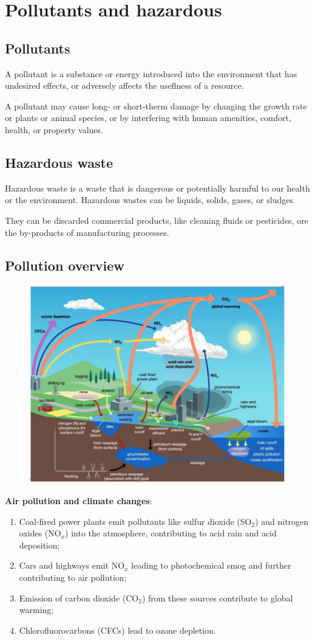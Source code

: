 \documentclass{article}
\newcommand{\cfig}[1]{%
  \begin{figure}[ht!]%
    \centering%
    #1%
  \end{figure}%
}
\begin{document}
\section{Pollutants and hazardous}
\subsection{Pollutants}
A pollutant is a substance or energy introduced into the environment that
has undesired effects, or adversely affects the useflness of a resource.

A pollutant may cause long- or short-therm damage by changing the growth
rate or plants or animal species, or by interfering with human amenities,
comfort, health, or property values.

\subsection{Hazardous waste}
Hazardous waste is a waste that is dangerous or potentially harmful to our
health or the environment. Hazardous wastes can be liquids, solids, gases, or sludges.

They can be discarded commercial products, like cleaning fluids or pesticides,
ore the by-products of manufacturing processes.

\subsection{Pollution overview}
\cfig{\includegraphics*[width=.8\textwidth]{media/pollution-overview.png}}

\textbf{Air pollution and climate changes}:
\begin{enumerate}
    \item Coal-fired power plants emit pollutants like sulfur dioxide (SO$_2$)
        and nitrogen oxides (NO$_x$) into the atmosphere, contributing to acid rain and acid deposition;
    \item Cars and highways emit NO$_x$ leading to photochemical smog and
        further contributing to air pollution;
    \item Emission of carbon dioxide (CO$_2$) from these sources contribute to
        global warming;
    \item Chlorofluorocarbons (CFCs) lead to ozone depletion.
\end{enumerate}
\end{document}
